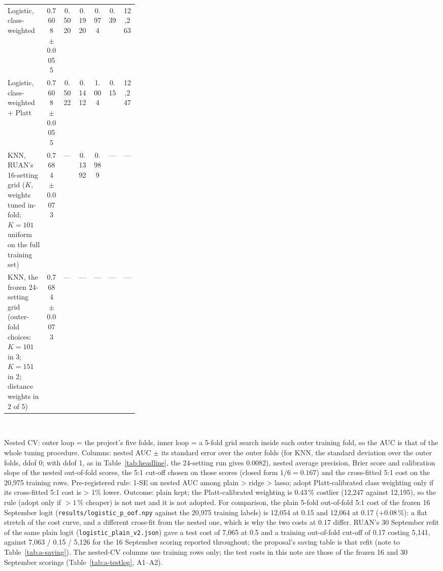 \begin{table}[!htbp]
\begin{tabular}{@{}L{0.30\linewidth}cccccc@{}}
    Logistic, class-weighted & 0.7608 $\pm$ 0.0055 & 0.5020 & 0.1920 & 0.974 & 0.39 & 12,263 \\
    Logistic, class-weighted + Platt & 0.7608 $\pm$ 0.0055 & 0.5022 & 0.1412 & 1.004 & 0.15 & 12,247 \\
    KNN, RUAN's 16-setting grid ($K$, weights tuned in-fold; $K=101$ uniform on the full training set) & 0.7684 $\pm$ 0.0073 & --- & 0.1392 & 0.989 & --- & --- \\
    KNN, the frozen 24-setting grid (outer-fold choices: $K = 101$ in 3; $K = 151$ in 2; distance weights in 2 of 5) & 0.7684 $\pm$ 0.0073 & --- & --- & --- & --- & --- \\
    \bottomrule
  \end{tabular}
  \\[3pt]\begin{minipage}{\linewidth}\footnotesize Nested CV: outer loop = the project's five folds, inner loop = a 5-fold grid search inside each outer training fold, so the AUC is that of the whole tuning procedure. Columns: nested AUC $\pm$ its standard error over the outer folds (for KNN, the standard deviation over the outer folds, ddof 0; with ddof 1, as in Table~\ref{tab:headline}, the 24-setting run gives 0.0082), nested average precision, Brier score and calibration slope of the nested out-of-fold scores, the 5:1 cut-off chosen on those scores (closed form $1/6 = 0.167$) and the cross-fitted 5:1 cost on the 20,975 training rows. Pre-registered rule: 1-SE on nested AUC among plain > ridge > lasso; adopt Platt-calibrated class weighting only if its cross-fitted 5:1 cost is > 1\% lower. Outcome: plain kept; the Platt-calibrated weighting is 0.43\,\% costlier (12,247 against 12,195), so the rule (adopt only if $>1\,\%$ cheaper) is not met and it is not adopted.  For comparison, the plain 5-fold out-of-fold 5:1 cost of the frozen 16 September logit (\texttt{results/logistic\_\allowbreak{}p\_\allowbreak{}oof.npy} against the 20,975 training labels) is 12,054 at 0.15 and 12,064 at 0.17 (+0.08\,\%): a flat stretch of the cost curve, and a different cross-fit from the nested one, which is why the two costs at 0.17 differ. RUAN's 30 September refit of the same plain logit (\texttt{logistic\_\allowbreak{}plain\_\allowbreak{}v2.json}) gave a test cost of 7,065 at 0.5 and a training out-of-fold cut-off of 0.17 costing 5,141, against 7,063 / 0.15 / 5,126 for the 16 September scoring reported throughout; the proposal's saving table is that refit (note to Table~\ref{tab:a-saving}). The nested-CV columns use training rows only; the test costs in this note are those of the frozen 16 and 30 September scorings (Table~\ref{tab:a-testlog}, A1--A2).\end{minipage}
\end{table}

